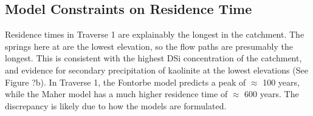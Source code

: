 












\subsection{Model Constraints on Residence Time}

Residence times in Traverse 1 are explainably the longest in the catchment. The springs here at are the lowest elevation, so the flow paths are presumably the longest. This is consistent with the highest DSi concentration of the catchment, and evidence for secondary precipitation of kaolinite at the lowest elevations (See Figure ?b). In Traverse 1, the Fontorbe model predicts a peak of $\approx$ 100 years, while the Maher model has a much higher residence time of $\approx$ 600 years. The discrepancy is likely due to how the models are formulated.

